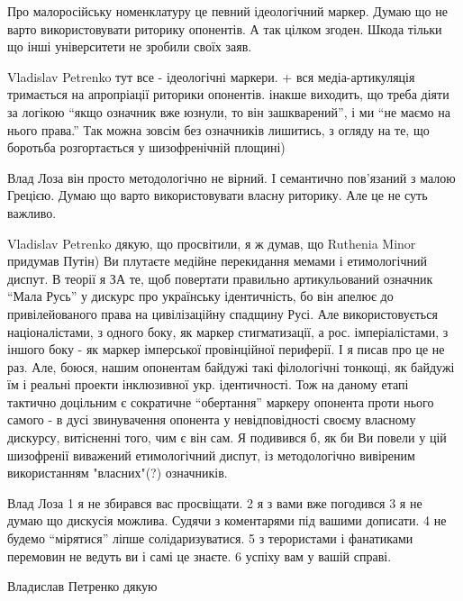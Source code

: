 \begin{itemize}
Про малоросійську номенклатуру це певний ідеологічний маркер. Думаю що не варто
використовувати риторику опонентів. А так цілком згоден. Шкода тільки що інші
університети не зробили своїх заяв.


Vladislav Petrenko тут все - ідеологічні маркери. + вся медіа-артикуляція
тримається на апропріації риторики опонентів. інакше виходить, що треба діяти
за логікою \enquote{якщо означник вже юзнули, то він зашкварений}, і ми
\enquote{не маємо на нього права.} Так можна зовсім без означників лишитись, з
огляду на те, що боротьба розгортається у шизофренічній площині)


Влад Лоза він просто методологічно не вірний. І семантично пов'язаний з малою
Грецією. Думаю що варто використовувати власну риторику. Але це не суть
важливо.


Vladislav Petrenko дякую, що просвітили, я ж думав, що Ruthenia Minor придумав
Путін) Ви плутаєте медійне перекидання мемами і етимологічний диспут. В теорії
я ЗА те, щоб повертати правильно артикульований означник \enquote{Мала Русь} у дискурс
про українську ідентичність, бо він апелює до привілейованого права на
цивілізаційну спадщину Русі. Але використовується націоналістами, з одного
боку, як маркер стигматизації, а рос. імперіалістами, з іншого боку - як маркер
імперської провінційної периферії. І я писав про це не раз. Але, боюся, нашим
опонентам байдужі такі філологічні тонкощі, як байдужі їм і реальні проекти
інклюзивної укр. ідентичності. Тож на даному етапі тактично доцільним є
сократичне \enquote{обертання} маркеру опонента проти нього самого - в дусі
звинувачення опонента у невідповідності своєму власному дискурсу, витісненні
того, чим є він сам. Я подивився б, як би Ви повели у цій шизофренії виважений
етимологічний диспут, із методологічно вивіреним використанням "власних"(?)
означників.


Влад Лоза 1 я не збирався вас просвіщати. 2 я з вами вже погодився 3 я не думаю
що дискусія можлива. Судячи з коментарями під вашими дописати. 4 не будемо
\enquote{мірятися} ліпше солідаризуватися. 5 з терористами і фанатиками перемовин не
ведуть ви і самі це знаєте. 6 успіху вам у вашій справі.

Владислав Петренко дякую



\end{itemize}
